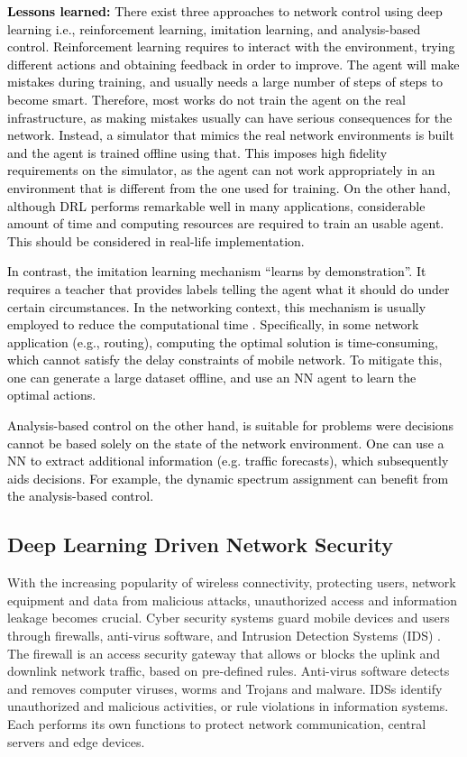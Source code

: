 \documentclass[journal,comsoc,letter]{IEEEtran}
\newcommand{\edit}[1]{\textcolor{black}{#1}}
\newcommand{\rev}[1]{\textcolor{black}{#1}}
\begin{document}
\edit{\textbf{Lessons learned:} There exist three approaches to network control using deep learning i.e., reinforcement learning, imitation learning, and analysis-based control. Reinforcement learning requires to interact with the environment, trying different actions and obtaining feedback in order to improve. The agent will make mistakes during training, and usually needs a large number of steps of steps to become smart. Therefore, most works do not train the agent on the real infrastructure, as making mistakes usually can have serious consequences for the network. Instead, a simulator that mimics the real network environments is built and the agent is trained offline using that. This imposes high fidelity requirements on the simulator, as the agent can not work appropriately in an environment that is different from the one used for training. \rev{On the other hand, although DRL performs remarkable well in many applications, considerable amount of time and computing resources are required to train an usable agent. This should be considered in real-life implementation.}}

\edit{In contrast, the imitation learning mechanism ``learns by demonstration''. It requires a teacher that provides labels telling the agent what it should do under certain circumstances. In the networking context, this mechanism is usually employed to reduce the computational time \cite{mao2017routing}. Specifically, in some network application (e.g., routing), computing the optimal solution is time-consuming, which cannot satisfy the delay constraints of mobile network. To mitigate this, one can generate a large dataset offline, and use an NN agent to learn the optimal actions.}

\edit{Analysis-based control on the other hand, is suitable for problems were decisions cannot be based solely on the state of the network environment. One can use a NN to extract additional information (e.g. traffic forecasts), which subsequently aids decisions. For example, the dynamic spectrum assignment can benefit from the analysis-based control.}

\subsection{Deep Learning Driven Network Security}\label{sec:security}
With the increasing popularity of wireless connectivity, protecting users, network equipment and data from malicious attacks, unauthorized access and information leakage becomes crucial. Cyber security systems guard mobile devices and users through firewalls, anti-virus software, and Intrusion Detection Systems (IDS) \cite{buczak2016survey}. The firewall is an access security gateway that allows or blocks the uplink and downlink network traffic, based on pre-defined rules. Anti-virus software detects and removes computer viruses, worms and Trojans and malware. IDSs identify unauthorized and malicious activities, or rule violations in information systems. Each performs its own functions to protect network communication, central servers and edge devices.
\end{document}
